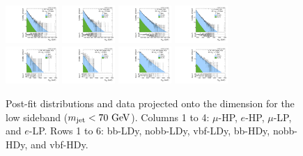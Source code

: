 \begin{figure}[htbp]
  \includegraphics[width=0.18\textwidth]{fig/fitValidation/PostFit_SR_MVV_MJJ020to070__mu_HP_nobb_HDy_Run2.pdf}
  \includegraphics[width=0.18\textwidth]{fig/fitValidation/PostFit_SR_MVV_MJJ020to070__e_HP_nobb_HDy_Run2.pdf}
  \includegraphics[width=0.18\textwidth]{fig/fitValidation/PostFit_SR_MVV_MJJ020to070__mu_LP_nobb_HDy_Run2.pdf}
  \includegraphics[width=0.18\textwidth]{fig/fitValidation/PostFit_SR_MVV_MJJ020to070__e_LP_nobb_HDy_Run2.pdf}\\
  \includegraphics[width=0.18\textwidth]{fig/fitValidation/PostFit_SR_MVV_MJJ020to070__mu_HP_vbf_HDy_Run2.pdf}
  \includegraphics[width=0.18\textwidth]{fig/fitValidation/PostFit_SR_MVV_MJJ020to070__e_HP_vbf_HDy_Run2.pdf}
  \includegraphics[width=0.18\textwidth]{fig/fitValidation/PostFit_SR_MVV_MJJ020to070__mu_LP_vbf_HDy_Run2.pdf}
  \includegraphics[width=0.18\textwidth]{fig/fitValidation/PostFit_SR_MVV_MJJ020to070__e_LP_vbf_HDy_Run2.pdf}\\
  \caption{
    Post-fit distributions and data projected onto the \MVV dimension for the low \MJ sideband ($\MJ<70\unit{GeV}$).
    Columns 1 to 4: $\mu$-HP, $e$-HP, $\mu$-LP, and $e$-LP.
    Rows 1 to 6: bb-LDy, nobb-LDy, vbf-LDy, bb-HDy, nobb-HDy, and vbf-HDy.
  }
  \label{fig:postfit_MVV_MJJ020to070_Run2}
\end{figure}

